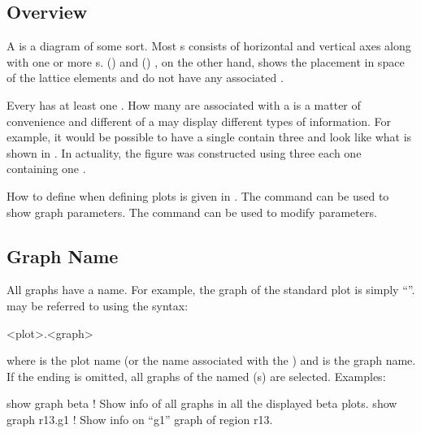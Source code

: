 {{{%
\subsection{Overview}
\label{s:graph.overview}

A  is a diagram of some sort. Most s consists of horizontal and vertical axes
along with one or more s.  () and 
() , on the other hand, shows the placement in space of the lattice
elements and do not have any associated .

Every  has at least one . How many  are associated with a 
is a matter of convenience and different  of a  may display different types of
information. For example, it would be possible to have a single  contain three 
and look like what is shown in . In actuality, the figure was constructed using
three  each one containing one .

How to define  when defining  plots is given in . The
 command can be used to show graph parameters. The  command can
be used to modify  parameters.

\subsection{Graph Name}
\label{s:graph.name}

All graphs have a name. For example, the graph of the standard  plot is simply ``''.
 may be referred to using the syntax:
\begin{example}
  <plot>.<graph>
\end{example}
where  is the plot name (or the  name associated with the ) and
 is the graph name. If the  ending is omitted, all graphs of the named
(s) are selected. Examples:
\begin{example}
  show graph beta   ! Show info of all graphs in all the displayed beta plots.
  show graph r13.g1 ! Show info on ``g1'' graph of region r13.
\end{example}

}}}
